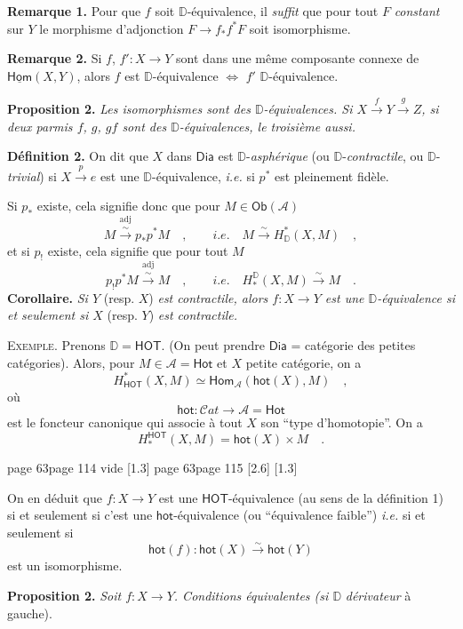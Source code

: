 \documentclass[11pt,leqno]{article}
\newcommand{\printedpage}[1]{\marginnote{\scriptsize\sffamily ed.\ #1}}
\newcommand{\msp}[1]{%
  \begingroup\def\thismsp{#1}\def\blankmsp{page 114 vide}%
  \ifx\thismsp\blankmsp
    \marginnote{\scriptsize\sffamily [114: vide]}[1.3\baselineskip]%
  \else\def\followingmsp{page 115}%
    \ifx\thismsp\followingmsp
      \marginnote{\scriptsize\sffamily [page 115]}[2.6\baselineskip]%
    \else\marginnote{\scriptsize\sffamily [#1]}[1.3\baselineskip]\fi
  \fi\endgroup}
\newcommand{\DD}{\ensuremath{\mathbb{D}}}
\newcommand{\cA}{\ensuremath{\mathcal{A}}}
\newcommand{\Dia}{\ensuremath{\mathsf{Dia}}}
\newcommand{\Ob}{\ensuremath{\mathsf{Ob}}}
\newcommand{\Hom}{\ensuremath{\mathsf{Hom}}}
\newcommand{\hot}{\ensuremath{\mathsf{hot}}}
\newcommand{\Hot}{\ensuremath{\mathsf{Hot}}}
\newcommand{\HOT}{\ensuremath{\mathsf{HOT}}}
\newcommand{\isolongto}{\overset{\sim}{\longrightarrow}}
\begin{document}
\noindent\textbf{Remarque 1.} Pour que $f$ soit $\DD$-équivalence, il \textit{suffit} que pour tout $F$ \textit{constant} sur $Y$ le morphisme d'adjonction $F \to f_*f^*F$ soit isomorphisme.

\noindent\textbf{Remarque 2.} Si $f$, $f' : X \to Y$ sont dans une même composante connexe de $\underline{\Hom}(X, Y)$, alors $f$ est $\DD$-équivalence $\Leftrightarrow$ $f'$ $\DD$-équivalence.

\noindent\textbf{Proposition 2.} \textit{Les isomorphismes sont des $\DD$-équivalences. Si $X \overset{f}{\to} Y \overset{g}{\to} Z$, si deux parmis $f$, $g$, $gf$ sont des $\DD$-équivalences, le troisième aussi.} %

\noindent\textbf{Définition 2.} On dit que $X$ dans $\Dia$ est $\DD$-\textit{asphérique} (ou $\DD$-\textit{contractile}, ou $\DD$-\textit{trivial}) si $X \overset{p}{\to} e$ est une $\DD$-équivalence, \textit{i.e.} si $p^*$ est pleinement fidèle.

Si $p_*$ existe, cela signifie donc que pour $M \in \Ob(\cA)$
\[
M \overset{\mathrm{adj}}{\isolongto} p_*p^*M \quad , \qquad \textit{i.e.} \quad M \isolongto H^*_{\DD}(X, M) \quad ,
\]
et si $p_!$ existe, cela signifie que pour tout $M$
\[
p_!p^*M \overset{\mathrm{adj}}{\isolongto} M \quad , \qquad \textit{i.e.} \quad H^{\DD}_*(X, M) \isolongto M \quad .
\]
\textbf{Corollaire.} \textit{Si $Y$} (resp. $X$) \textit{est contractile, alors $f : X \to Y$ est une $\DD$-équivalence si et seulement si $X$} (resp. $Y$) \textit{est contractile.}

\noindent\textsc{Exemple}. Prenons $\DD = \HOT$. (On peut prendre $\Dia$ = catégorie des petites catégories). Alors, pour $M \in \cA = \Hot$ et $X$ petite catégorie, on a
\[
H^*_{\HOT}(X, M) \simeq \Hom_{\cA}(\hot(X), M) \quad ,
\]
où
\[
\hot : \mathcal{C}\mathit{at} \longrightarrow \cA = \Hot
\]
est le foncteur canonique qui associe à tout $X$ son “type d'homotopie”. On a
\[
H^{\HOT}_*(X, M) = \hot(X) \times M \quad .
\]

\noindent\msp{page 63}

\noindent On en déduit que $f : X \to Y$ est une $\HOT$-équivalence (au sens de la définition 1) si et seulement si c'est une $\hot$-équivalence (ou “équivalence faible”) \textit{i.e.} si et seulement si
\[
\hot(f) : \hot(X) \isolongto \hot(Y)
\]
\printedpage{37}
est un isomorphisme.

\noindent\textbf{Proposition 2.} \textit{Soit $f : X \to Y$. Conditions équivalentes (si $\DD$} \textit{dérivateur} à gauche). %
\end{document}
